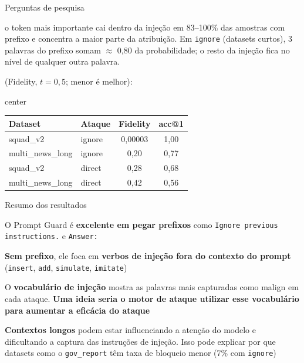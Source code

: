 \documentclass[aspectratio=169]{beamer}
\begin{document}
\begin{frame}{Perguntas de pesquisa}
  {\hspace{0.03\paperwidth} o token mais importante cai dentro da injeção em 83--100\% das amostras com prefixo e concentra a maior parte da atribuição. Em \texttt{ignore} (datasets curtos), 3 palavras do prefixo somam $\approx$ 0,80 da probabilidade; o resto da injeção fica no nível de qualquer outra palavra.\par}
  {\hspace{0.03\paperwidth} (Fidelity, $t{=}0{,}5$; menor é melhor):\par}
  \vspace{4pt}
  \begin{adjustbox}{center}
  \fontsize{8.5}{11}\selectfont
  \begin{tabular}{llcc}
  \toprule
  \textbf{Dataset} & \textbf{Ataque} & \textbf{Fidelity} & \textbf{acc@1} \\
  \midrule
  squad\_v2 & ignore & 0,00003 & 1,00 \\
  multi\_news\_long & ignore & 0,20 & 0,77 \\
  squad\_v2 & direct & 0,28 & 0,68 \\
  multi\_news\_long & direct & 0,42 & 0,56 \\
  \bottomrule
  \end{tabular}
  \end{adjustbox}
\end{frame}

\begin{frame}{Resumo dos resultados}
  \begin{ciLista}
    \item O Prompt Guard é \textbf{excelente em pegar prefixos} como \texttt{Ignore previous instructions.} e \texttt{Answer:}
    \item \textbf{Sem prefixo}, ele foca em \textbf{verbos de injeção fora do contexto do prompt} (\texttt{insert}, \texttt{add}, \texttt{simulate}, \texttt{imitate})
    \item O \textbf{vocabulário de injeção} mostra as palavras mais capturadas como malign em cada ataque. \textbf{Uma ideia seria o motor de ataque utilizar esse vocabulário para aumentar a eficácia do ataque}
    \item \textbf{Contextos longos} podem estar influenciando a atenção do modelo e dificultando a captura das instruções de injeção. Isso pode explicar por que datasets como o \texttt{gov\_report} têm taxa de bloqueio menor (7\% com \texttt{ignore})
  \end{ciLista}
\end{frame}
\end{document}
